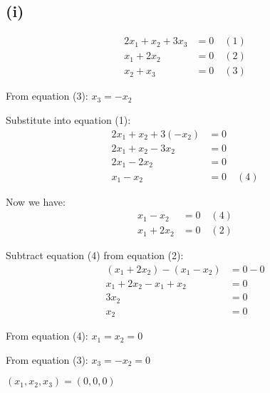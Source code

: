 \subsection*{(i)}
\begin{align*}
	2x_1 + x_2 + 3x_3 & = 0 \quad (1) \\
	x_1 + 2x_2        & = 0 \quad (2) \\
	x_2 + x_3         & = 0 \quad (3)
\end{align*}

From equation (3): $x_3 = -x_2$

Substitute into equation (1):
\begin{align*}
	2x_1 + x_2 + 3(-x_2) &= 0 \\
	2x_1 + x_2 - 3x_2 &= 0 \\
	2x_1 - 2x_2 &= 0 \\
	x_1 - x_2 &= 0 \quad (4)
\end{align*}

Now we have:
\begin{align*}
	x_1 - x_2 &= 0 \quad (4) \\
	x_1 + 2x_2 &= 0 \quad (2)
\end{align*}

Subtract equation (4) from equation (2):
\begin{align*}
	(x_1 + 2x_2) - (x_1 - x_2) &= 0 - 0 \\
	x_1 + 2x_2 - x_1 + x_2 &= 0 \\
	3x_2 &= 0 \\
	x_2 &= 0
\end{align*}

From equation (4): $x_1 = x_2 = 0$

From equation (3): $x_3 = -x_2 = 0$

$\boxed{(x_1, x_2, x_3) = (0, 0, 0)}$
